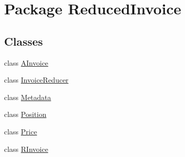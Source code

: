 \hypertarget{namespace_reduced_invoice}{}\section{Package Reduced\+Invoice}
\label{namespace_reduced_invoice}
\subsection*{Classes}
\begin{DoxyCompactItemize}
\item 
class \hyperlink{class_reduced_invoice_1_1_a_invoice}{A\+Invoice}
\item 
class \hyperlink{class_reduced_invoice_1_1_invoice_reducer}{Invoice\+Reducer}
\item 
class \hyperlink{class_reduced_invoice_1_1_metadata}{Metadata}
\item 
class \hyperlink{class_reduced_invoice_1_1_position}{Position}
\item 
class \hyperlink{class_reduced_invoice_1_1_price}{Price}
\item 
class \hyperlink{class_reduced_invoice_1_1_r_invoice}{R\+Invoice}
\end{DoxyCompactItemize}
